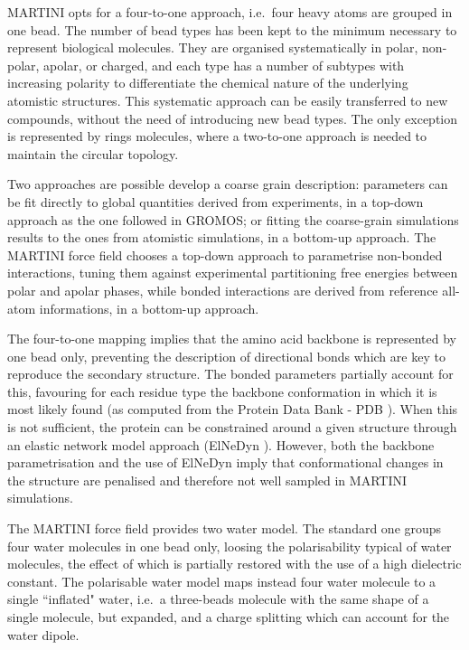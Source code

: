 MARTINI opts for a four-to-one approach, i.e.\ four heavy atoms are grouped in one bead. The number of bead types has been kept to the minimum necessary to represent biological molecules. They are organised systematically in polar, non-polar, apolar, or charged, and each type has a number of subtypes with increasing polarity to differentiate the chemical nature of the underlying atomistic structures.
%
This systematic approach can be easily transferred to new compounds, without the need of introducing new bead types.
%
The only exception is represented by rings molecules, where a two-to-one approach is needed to maintain the circular topology.

Two approaches are possible develop a coarse grain description: parameters can be fit directly to global quantities derived from experiments, in a top-down approach as the one followed in GROMOS; or fitting the coarse-grain simulations results to the ones from atomistic simulations, in a bottom-up approach.
%
The MARTINI force field chooses a top-down approach to parametrise non-bonded interactions, tuning them against experimental partitioning free energies between polar and apolar phases, while bonded interactions are derived from reference all-atom informations, in a bottom-up approach.

The four-to-one mapping implies that the amino acid backbone is represented by one bead only, preventing the description of directional bonds which are key to reproduce the secondary structure. The bonded parameters partially account for this, favouring for each residue type the backbone conformation in which it is most likely found (as computed from the Protein Data Bank - PDB \cite{PDB}). When this is not sufficient, the protein can be constrained around a given structure through an elastic network model approach (ElNeDyn \cite{Periole2009}). However, both the backbone parametrisation and the use of ElNeDyn imply that conformational changes in the structure are penalised and therefore not well sampled in MARTINI simulations.

The MARTINI force field provides two water model. The standard one groups four water molecules in one bead only, loosing the polarisability typical of water molecules, the effect of which is partially restored with the use of a high dielectric constant. The polarisable water model \cite{Yesylevskyy2010} maps instead four water molecule to a single ``inflated" water, i.e.\ a three-beads molecule with the same shape of a single molecule, but expanded, and a charge splitting which can account for the water dipole.

